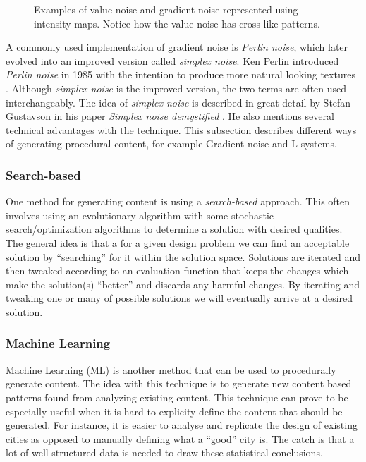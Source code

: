 \begin{figure}[h!]
  \caption{Examples of value noise and gradient noise represented using intensity maps. Notice how the value noise has cross-like patterns.}
  \label{fig:noisetypes}
\end{figure}

A commonly used implementation of gradient noise is \textit{Perlin noise}, which later evolved into an improved version called \textit{simplex noise}.
Ken Perlin introduced \textit{Perlin noise} in 1985 with the intention to produce more natural looking textures \cite{perlin_noise}.
Although \textit{simplex noise} is the improved version, the two terms are often used interchangeably. The idea of \textit{simplex noise} is described in great detail by Stefan Gustavson in his paper \textit{Simplex noise demystified} \cite{simplex_noise}.
He also mentions several technical advantages with the technique.
This subsection describes different ways of generating procedural content, for example Gradient noise and L-systems.

\subsubsection{Search-based}
One method for generating content is using a \textit{search-based} approach.
This often involves using an evolutionary algorithm with some stochastic search/optimization algorithms to determine a solution with desired qualities.
The general idea is that a for a given design problem we can find an acceptable solution by ``searching'' for it within the solution space.
Solutions are iterated and then tweaked according to an evaluation function that keeps the changes which make the solution(s) ``better'' and discards any harmful changes.
By iterating and tweaking one or many of possible solutions we will eventually arrive at a desired solution.

\subsubsection{Machine Learning}
Machine Learning (ML) is another method that can be used to procedurally generate content.
The idea with this technique is to generate new content based patterns found from analyzing existing content.
This technique can prove to be especially useful when it is hard to explicity define the content that should be generated.
For instance, it is easier to analyse and replicate the design of existing cities as opposed to manually defining what a ``good'' city is.
The catch is that a lot of well-structured data is needed to draw these statistical conclusions.

